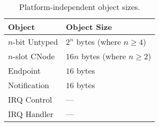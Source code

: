 {\begin{table}[tbp]
        \begin{center}
            \begin{tabular}{ll}
                \toprule
                  Object                & Object Size \\
                \midrule
                  $n$-bit Untyped       & $2^n$ bytes (where $n \ge 4$) \\
                  $n$-slot CNode        & $16n$ bytes (where $n \ge 2$) \\
                  Endpoint              & $16$ bytes \\
                  Notification          & $16$ bytes \\
                  IRQ Control           & --- \\
                  IRQ Handler           & --- \\
                \bottomrule
            \end{tabular}
        \end{center}
    \caption{Platform-independent object sizes.}
    \label{tab:obj_sizes}
\end{table}

}
